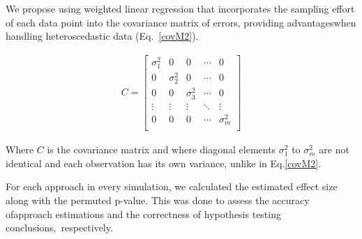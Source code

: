 \documentclass[Afour,sageh,times]{sagej}
\begin{document}
We propose using weighted linear regression that incorporates the sampling effort of each data point into the covariance matrix of errors, providing advantageswhen handling heteroscedastic data  (Eq. \ref{covM2}).

\begin{ceqn}
  \begin{align}\label{covM2}
    C = 
    \begin{bmatrix}
      \sigma_{1}^2  & 0 & 0 & \cdots & 0  \\
      0 & \sigma_{2}^2 & 0 & \cdots & 0\\
      0 & 0 & \sigma_{3}^2 & \cdots & 0\\
      \vdots  &  \vdots &  \vdots & \ddots &  \vdots \\
      0 & 0 & 0 & \cdots & \sigma_{m}^2 \\
      \end{bmatrix}
  \end{align}
  \end{ceqn}
  Where $C$ is the covariance matrix and where diagonal elements $\sigma_{1}^2$ to $\sigma_{m}^2$ are not identical and each observation has its own variance, unlike in Eq.\ref{covM2}.

For each approach in every simulation, we calculated the estimated effect size along with the permuted p-value. This was done to assess the accuracy ofapproach estimations and the correctness of hypothesis testing conclusions, respectively.
\end{document}
